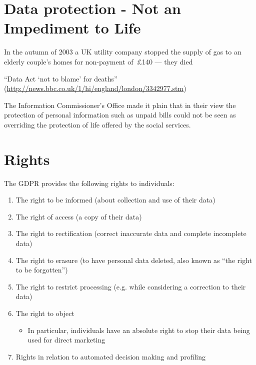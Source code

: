 \documentclass{article}
\begin{document}
\section{Data protection - Not an Impediment to Life}
In the autumn of 2003 a UK utility company stopped the supply of gas to an elderly couple's homes for non-payment of \pounds140 --- they died

\bigskip   
``Data Act `not to blame' for deaths'' (\href{http://news.bbc.co.uk/1/hi/england/london/3342977.stm}{http://news.bbc.co.uk/1/hi/england/london/3342977.stm})

\bigskip
The Information Commissioner's Office made it plain that in their view the protection of personal information such as unpaid bills could not be seen as overriding the protection of life offered by the social services.



\section{Rights}
The GDPR provides the following rights to individuals:
\begin{enumerate}
\item The right to be informed (about collection and use of their data)
\item The right of access (a copy of their data)
\item The right to rectification (correct inaccurate data and complete incomplete data)
\item The right to erasure (to have personal data deleted, also known as ``the right to be forgotten'')
\item The right to restrict processing (e.g. while considering a correction to their data)
\item The right to object
\begin{itemize}
\item In particular, individuals have an absolute right to stop their data being used for direct marketing
\end{itemize}
\item Rights in relation to automated decision making and profiling
\end{enumerate}
\end{document}
